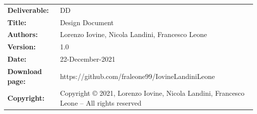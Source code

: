 
\begin{table}[h!]
\begin{tabu} to \textwidth { X[0.3,r,p] X[0.7,l,p] }
\hline

\textbf{Deliverable:} & DD\\
\textbf{Title:} & Design Document \\
\textbf{Authors:} & Lorenzo Iovine, Nicola Landini, Francesco Leone\\
\textbf{Version:} & 1.0 \\ 
\textbf{Date:} & 22-December-2021 \\
\textbf{Download page:} & https://github.com/fraleone99/IovineLandiniLeone \\
\textbf{Copyright:} & Copyright © 2021, Lorenzo Iovine, Nicola Landini, Francesco Leone – All rights reserved \\
\hline
\end{tabu}
\end{table}




\setcounter{page}{2}


\newpage
{}
\tableofcontents
\newpage
{}
\listoffigures
{}
\listoftables

\clearpage
{}
\label{sect:introduction}


\clearpage
{}
\label{sect:overview}


\clearpage
{}
\label{sect:requirements}



